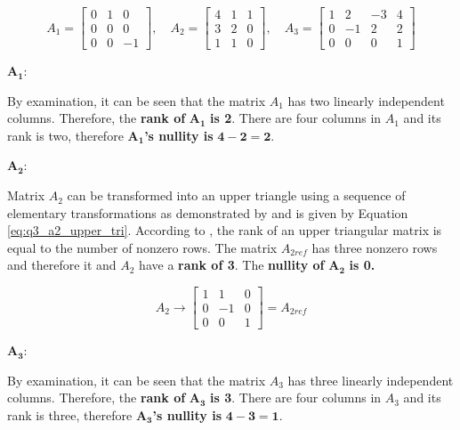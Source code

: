 \begin{question}{3} %
\begin{equation}
A_1 =
\begin{bmatrix}
     0 & 1 &  0 \\
     0 & 0 &  0 \\
     0 & 0 & -1
\end{bmatrix}, \quad
A_2 =
\begin{bmatrix}
     4 & 1 & 1 \\
     3 & 2 & 0 \\
     1 & 1 & 0
\end{bmatrix}, \quad
A_3 =
\begin{bmatrix}
    1 &  2 & -3 & 4 \\
    0 & -1 &  2 & 2 \\
    0 &  0 &  0 & 1
\end{bmatrix}  \nonumber
\end{equation}
\end{question}

\noindent $\mathbf{A_1}$:

By examination, it can be seen that the matrix $A_1$ has two linearly 
independent columns. Therefore, the \textbf{rank of} 
$\mathbf{A_1}$ \textbf{is 2}. There are four columns in $A_1$ and its rank is 
two, therefore $\mathbf{A_1}$\textbf{'s nullity is} $\mathbf{4 - 2 = 2}$.

\noindent $\mathbf{A_2}$:

Matrix $A_2$ can be transformed into an upper triangle using a sequence of
elementary transformations as demonstrated by \cite{chen1998linear} and is given
by Equation \ref{eq:q3_a2_upper_tri}. According to \cite{chen1998linear}, the 
rank of an upper triangular matrix is equal to the number of nonzero rows. 
The matrix $A_{2ref}$ has three nonzero rows and therefore it and $A_2$ have
a \textbf{rank of 3}. The \textbf{nullity of} $\mathbf{A_2}$ \textbf{is 0.}

\begin{equation} \label{eq:q3_a2_upper_tri}
  A_2 \longrightarrow 
  \begin{bmatrix}
  1 &  1 & 0 \\
  0 & -1 & 0 \\
  0 &  0 & 1
  \end{bmatrix}
  = A_{2ref}
\end{equation}

\noindent $\mathbf{A_3}$:

By examination, it can be seen that the matrix $A_3$ has three linearly 
independent columns. Therefore, the \textbf{rank of} 
$\mathbf{A_3}$ \textbf{is 3}. There are four columns in $A_3$ and its rank is 
three, therefore $\mathbf{A_3}$\textbf{'s nullity is} $\mathbf{4 - 3 = 1}$.
